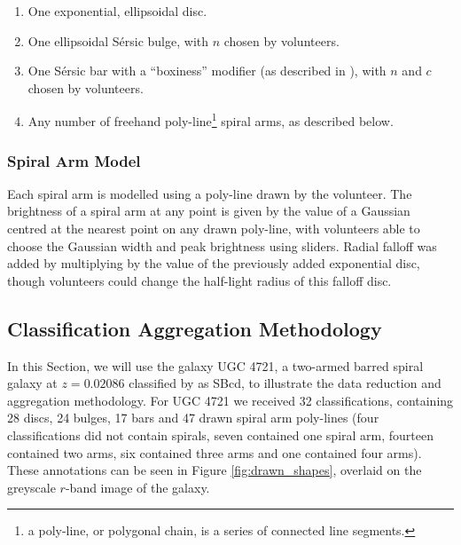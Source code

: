 \documentclass[main\.tex]{subfiles}
\begin{document}
\begin{enumerate}
\item One exponential, ellipsoidal disc.
\item One ellipsoidal S\'ersic bulge, with $n$ chosen by volunteers.
\item One S\'ersic bar with a ``boxiness'' modifier (as described in \citealt{galfit-paper}), with $n$ and $c$ chosen by volunteers.
\item Any number of freehand poly-line\footnote{a poly-line, or polygonal chain, is a series of connected line segments.} spiral arms, as described below.
\end{enumerate}

\subsubsection{Spiral Arm Model}
Each spiral arm is modelled using a poly-line drawn by the volunteer. The brightness of a spiral arm at any point is given by the value of a Gaussian centred at the nearest point on any drawn poly-line, with volunteers able to choose the Gaussian width and peak brightness using sliders. Radial falloff was added by multiplying by the value of the previously added exponential disc, though volunteers could change the half-light radius of this falloff disc.

\subsection{Classification Aggregation Methodology}

In this Section, we will use the galaxy UGC 4721, a two-armed barred spiral galaxy at $z=0.02086$ classified by \citet{deVaucouleurs1991} as SBcd, to illustrate the data reduction and aggregation methodology. For UGC 4721 we received 32 classifications, containing 28 discs, 24 bulges, 17 bars and 47 drawn spiral arm poly-lines (four classifications did not contain spirals, seven contained one spiral arm, fourteen contained two arms, six contained three arms and one contained four arms). These annotations can be seen in Figure \ref{fig:drawn_shapes}, overlaid on the greyscale $r$-band image of the galaxy.

\begin{figure*}
  \caption{Components drawn by volunteers for UGC 4721. The top left panel shows drawn discs, top right shows drawn bulges, bottom left shows drawn bars and bottom right shows drawn spiral arms. Discs, bulges and bars are displayed at twice their effective radii. These raw marks are subsequently aggregated to produce a consensus value for each galaxy component.}
  \label{fig:drawn_shapes}
\end{figure*}
\end{document}
